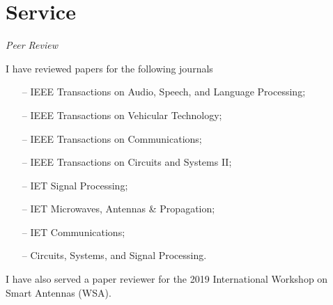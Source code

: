 \section{Service} 

{\sl Peer Review}

I have reviewed papers for the following journals
\begin{itemize}
	\item[--] IEEE Transactions on Audio, Speech, and Language Processing;
	\item[--] IEEE Transactions on Vehicular Technology;
	\item[--] IEEE Transactions on Communications;
	\item[--] IEEE Transactions on Circuits and Systems II;
	\item[--] IET Signal Processing;
	\item[--] IET Microwaves, Antennas \& Propagation;
	\item[--] IET Communications;
	\item[--] Circuits, Systems, and Signal Processing.
\end{itemize}
I have also served a paper reviewer for the 2019 International Workshop on Smart Antennas (WSA).
